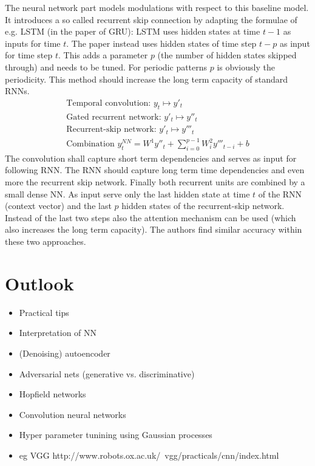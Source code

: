 \documentclass[12pt,a4paper]{article}
\begin{document}
The neural network part models modulations with respect to this baseline model. It introduces a so called recurrent skip connection by adapting the formulae of e.g. LSTM (in the paper of GRU): LSTM  uses hidden states at time $t-1$ as inputs for time $t$. The paper instead uses hidden states of time step $t-p$ as input for time step $t$. This adds a parameter $p$ (the number of hidden states skipped through) and needs to be tuned. For periodic patterns $p$ is obviously the periodicity. This method should increase the long term capacity of standard RNNs.
\begin{align}
 	\text{Temporal convolution: } y_t \mapsto y'_t \\
 	\text{Gated recurrent network: } y'_t \mapsto y''_t \\ 
	\text{Recurrent-skip network: } y'_t \mapsto y'''_t \\ 	
	\text{Combination } y_t^{NN} = W^1y''_t +  \sum_{i=0}^{p-1}W^2_iy'''_{t-i} + b   
\end{align}
The convolution shall capture short term dependencies and serves as input for following RNN. The RNN should capture long term time dependencies and even more the recurrent skip network.  Finally both recurrent units are combined by a small dense NN. As input serve only the last hidden state at time $t$ of the RNN (context vector) and the last $p$ hidden states of the recurrent-skip network. Instead of the last two steps also the attention mechanism can be used (which also increases the long term capacity). The authors find similar accuracy within these two approaches.


\section{Outlook}
\begin{itemize}\setlength\itemsep{0em}
\item Practical tips \cite{2012arXiv1206.5533B, Hinton2012Practical, DBLP:series/lncs/7700} 
\item Interpretation of NN \cite{2017arXiv170607979M, KinSchAlbMueErhKimDae18}
\item (Denoising) autoencoder 
\item Adversarial nets (generative vs. discriminative)
\item Hopfield networks \cite{ramsauer2020hopfield}
\item Convolution neural networks 
\item Hyper parameter tunining using Gaussian processes
\item eg VGG http://www.robots.ox.ac.uk/~vgg/practicals/cnn/index.html
\end{itemize}
\end{document}
